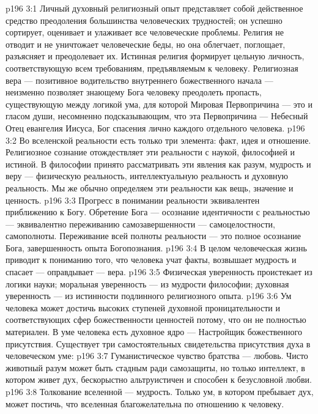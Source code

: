 \vs p196 3:1 Личный духовный религиозный опыт представляет собой действенное средство преодоления большинства человеческих трудностей; он успешно сортирует, оценивает и улаживает все человеческие проблемы. Религия не отводит и не уничтожает человеческие беды, но она облегчает, поглощает, разъясняет и преодолевает их. Истинная религия формирует цельную личность, соответствующую всем требованиям, предъявляемым к человеку. Религиозная вера --- позитивное водительство внутреннего божественного начала --- неизменно позволяет знающему Бога человеку преодолеть пропасть, существующую между логикой ума, для которой Мировая Первопричина --- это  и гласом души, несомненно подсказывающим, что эта Первопричина ---  Небесный Отец евангелия Иисуса, Бог спасения лично каждого отдельного человека.
\vs p196 3:2 Во вселенской реальности есть только три элемента: факт, идея и отношение. Религиозное сознание отождествляет эти реальности с наукой, философией и истиной. В философии принято рассматривать эти явления как разум, мудрость и веру --- физическую реальность, интеллектуальную реальность и духовную реальность. Мы же обычно определяем эти реальности как вещь, значение и ценность.
\vs p196 3:3 Прогресс в понимании реальности эквивалентен приближению к Богу. Обретение Бога --- осознание идентичности с реальностью --- эквивалентно переживанию самозавершенности --- самоцелостности, самополноты. Переживание всей полноты реальности --- это полное осознание Бога, завершенность опыта Богопознания.
\vs p196 3:4 В целом человеческая жизнь приводит к пониманию того, что человека учат факты, возвышает мудрость и спасает --- оправдывает --- вера.
\vs p196 3:5 Физическая уверенность проистекает из логики науки; моральная уверенность --- из мудрости философии; духовная уверенность --- из истинности подлинного религиозного опыта.
\vs p196 3:6 Ум человека может достичь высоких ступеней духовной проницательности и соответствующих сфер божественности ценностей потому, что он не полностью материален. В уме человека есть духовное ядро --- Настройщик божественного присутствия. Существует три самостоятельных свидетельства присутствия духа в человеческом уме:
\vs p196 3:7 \bibnobreakspace Гуманистическое чувство братства --- любовь. Чисто животный разум может быть стадным ради самозащиты, но только интеллект, в котором живет дух, бескорыстно альтруистичен и способен к безусловной любви.
\vs p196 3:8 \bibnobreakspace Толкование вселенной --- мудрость. Только ум, в котором пребывает дух, может постичь, что вселенная благожелательна по отношению к человеку.
